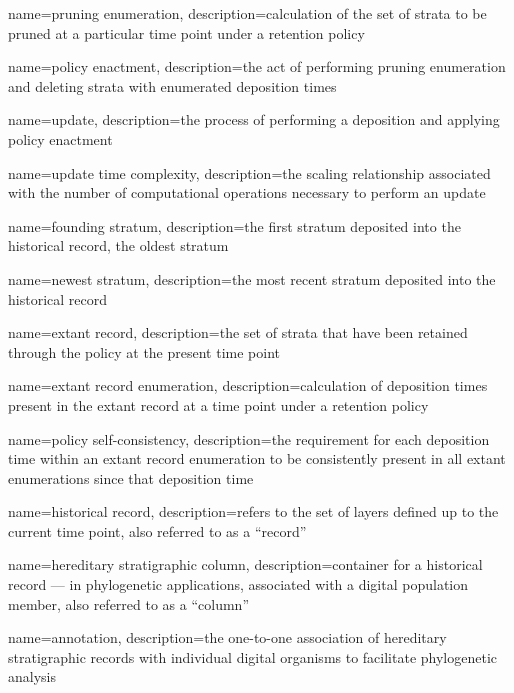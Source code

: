 {
    name=pruning enumeration,
    description={calculation of the set of strata to be pruned at a particular time point under a retention policy}
}

{
    name=policy enactment,
    description={the act of performing pruning enumeration and deleting strata with enumerated deposition times}
}

{
    name=update,
    description={the process of performing a deposition and applying policy enactment}
}

{
    name=update time complexity,
    description={the scaling relationship associated with the number of computational operations necessary to perform an update}
}

{
    name=founding stratum,
    description={the first stratum deposited into the historical record, the oldest stratum}
}

{
    name=newest stratum,
    description={the most recent stratum deposited into the historical record}
}

{
    name=extant record,
    description={the set of strata that have been retained through the policy at the present time point}
}

{
    name=extant record enumeration,
    description={calculation of deposition times present in the extant record at a time point under a retention policy}
}

{
    name=policy self-consistency,
    description={the requirement for each deposition time within an extant record enumeration to be consistently present in all extant enumerations since that deposition time}
}

{
    name=historical record,
    description={refers to the set of layers defined up to the current time point, also referred to as a ``record''}
}

{
    name=hereditary stratigraphic column,
    description={container for a historical record --- in phylogenetic applications, associated with a digital population member, also referred to as a ``column''}
}

{
    name=annotation,
    description={the one-to-one association of hereditary stratigraphic records with individual digital organisms to facilitate phylogenetic analysis}
}

